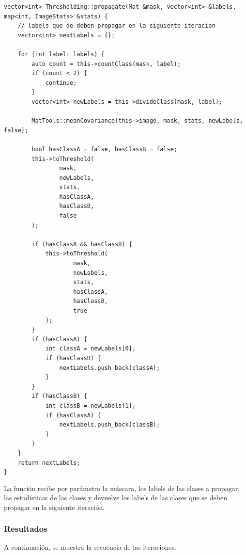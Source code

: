 \begin{lstlisting}[float=H,caption={Función propagate.},label={lst:propagation_fun}]
vector<int> Thresholding::propagate(Mat &mask, vector<int> &labels, map<int, ImageStats> &stats) {
    // labels que de deben propagar en la siguiente iteracion
    vector<int> nextLabels = {};

    for (int label: labels) {
        auto count = this->countClass(mask, label);
        if (count < 2) {
            continue;
        }
        vector<int> newLabels = this->divideClass(mask, label);

        MatTools::meanCovariance(this->image, mask, stats, newLabels, false);

        bool hasClassA = false, hasClassB = false;
        this->toThreshold(
                mask,
                newLabels,
                stats,
                hasClassA,
                hasClassB,
                false
        );

        if (hasClassA && hasClassB) {
            this->toThreshold(
                    mask,
                    newLabels,
                    stats,
                    hasClassA,
                    hasClassB,
                    true
            );
        }
        if (hasClassA) {
            int classA = newLabels[0];
            if (hasClassB) {
                nextLabels.push_back(classA);
            }
        }
        if (hasClassB) {
            int classB = newLabels[1];
            if (hasClassA) {
                nextLabels.push_back(classB);
            }
        }
    }
    return nextLabels;
}
\end{lstlisting}

La función recibe por parámetro la máscara, los labels de las clases a propagar, las estadísticas de las clases y devuelve los labels de las clases que se deben propagar en la siguiente iteración.

\subsubsection{Resultados}\label{subsubsec:results}

A continuación, se muestra la secuencia de las iteraciones.


